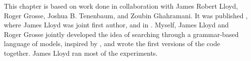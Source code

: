 
This chapter is based on work done in collaboration with James Robert Lloyd, Roger Grosse, Joshua B. Tenenbaum, and Zoubin Ghahramani.  It was published \citep{DuvLloGroetal13}, where James Lloyd was joint first author, and in \citep{LloDuvGroetal14}.
Myself, James Lloyd and Roger Grosse jointly developed the idea of searching through a grammar-based language of \gp{} models, inspired by \citet{grosse2012exploiting}, and wrote the first versions of the code together.
James Lloyd ran most of the experiments.




